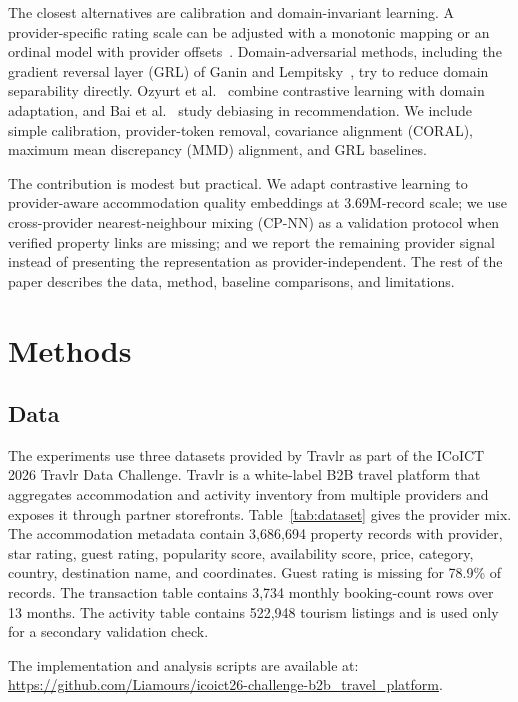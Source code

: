 \documentclass[conference,a4paper]{IEEEtran}
\begin{document}
The closest alternatives are calibration and domain-invariant learning. A provider-specific rating scale can be adjusted with a monotonic mapping or an ordinal model with provider offsets~\cite{mccullagh1980regression}. Domain-adversarial methods, including the gradient reversal layer (GRL) of Ganin and Lempitsky~\cite{ganin2015unsupervised}, try to reduce domain separability directly. Ozyurt et al.~\cite{ozyurt2023cluda} combine contrastive learning with domain adaptation, and Bai et al.~\cite{bai2024kddebias} study debiasing in recommendation. We include simple calibration, provider-token removal, covariance alignment (CORAL), maximum mean discrepancy (MMD) alignment, and GRL baselines.

The contribution is modest but practical. We adapt contrastive learning to provider-aware accommodation quality embeddings at 3.69M-record scale; we use cross-provider nearest-neighbour mixing (CP-NN) as a validation protocol when verified property links are missing; and we report the remaining provider signal instead of presenting the representation as provider-independent. The rest of the paper describes the data, method, baseline comparisons, and limitations.

\section{Methods}

\subsection{Data}

The experiments use three datasets provided by Travlr as part of the ICoICT 2026 Travlr Data Challenge. Travlr is a white-label B2B travel platform that aggregates accommodation and activity inventory from multiple providers and exposes it through partner storefronts. Table~\ref{tab:dataset} gives the provider mix. The accommodation metadata contain 3,686,694 property records with provider, star rating, guest rating, popularity score, availability score, price, category, country, destination name, and coordinates. Guest rating is missing for 78.9\% of records. The transaction table contains 3,734 monthly booking-count rows over 13 months. The activity table contains 522,948 tourism listings and is used only for a secondary validation check.

The implementation and analysis scripts are available at: {\small\url{https://github.com/Liamours/icoict26-challenge-b2b_travel_platform}}.
\end{document}
